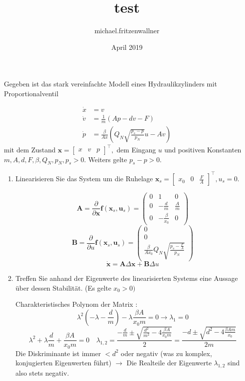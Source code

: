 \documentclass{article}
\title{test}
\author{michael.fritzenwallner }
\date{April 2019}
\begin{document}

\begin{task}
Gegeben ist das stark vereinfachte Modell eines Hydraulikzylinders mit Proportionalventil

\[ 
\begin{aligned} \dot{x} &=v \\ \dot{v} &=\frac{1}{m}(A p-d v-F) \\ \dot{p} &=\frac{\beta}{A x}\left(Q_{N} \sqrt{\frac{p_{s}-p}{p_{N}}} u-A v\right) \end{aligned}
 \]
mit dem Zustand $\mathbf{x}=\left[\begin{array}{ccc}{x} & {v} & {p}\end{array}\right]^{\top},$ dem Eingang $u$ und positiven Konstanten
$m, A, d, F, \beta, Q_{N}, p_{N}, p_{s}>0 .$ Weiters gelte $p_{s}-p>0$.
\begin{enumerate}[i]
    \item Linearisieren Sie das System um die Ruhelage $\mathbf{x}_{s}=\left[\begin{array}{ccc}{x_{0}} & {0} & {\frac{F}{A}}\end{array}\right]^{\top}, u_{s}=0$.
    \begin{solution}
    \[ 
\mathbf{A}=\frac{\partial}{\partial \mathbf{x}} \mathbf{f}\left(\mathbf{x}_{s}, \mathbf{u}_{s}\right) = 
\begin{pmatrix}
 0 & 1 & 0\\
 0 & -\frac{d}{m} & \frac{A}{m}\\
 0 & -\frac{\beta}{x_0} & 0
\end{pmatrix}
 \]
    \[
    \mathbf{B}=\frac{\partial}{\partial u} \mathbf{f}\left(\mathbf{x}_{s}, \mathbf{u}_{s}\right) = 
    \begin{pmatrix}
 0\\
 0\\
 \frac{\beta}{A x_0} Q_N \sqrt{\frac{p_s - \frac{F}{A}}{p_N}}
\end{pmatrix}
 \]
 \[\dot{\mathbf{x}}= \mathbf{A} \Delta \mathbf{x} + \mathbf{B} \Delta u \]
    \end{solution}
    \item Treffen Sie anhand der Eigenwerte des linearisierten Systems eine Aussage über
dessen Stabilität. (Es gelte $x_{0}>0 )$
\begin{solution}
    Charakteristisches Polynom der Matrix :
    \[\lambda^2 \left(-\lambda-\frac{d}{m}\right) - \lambda \frac{\beta A}{x_0 m} = 0 \rightarrow \lambda_1 = 0\]
    \[
    \lambda^2+\lambda \frac{d}{m}+\frac{\beta A}{x_0 m} = 0 \quad \lambda_{1,2} = \frac{-\frac{d}{m} \pm \sqrt{\frac{d^2}{m^2}-4\frac{\beta A}{x_0 m}}}{2} =
    \frac{-d \pm \sqrt{d^2-4\frac{\beta A m}{x_0}}}{2m}
    \]
    Die Diskriminante ist immer $< d^2$ oder negativ (was zu komplex, konjugierten Eigenwerten führt) $\rightarrow$ Die Realteile der Eigenwerte $\lambda_{1,2}$ sind also stets negativ.
    

\end{solution}
\end{enumerate}
\end{task}
\end{document}
